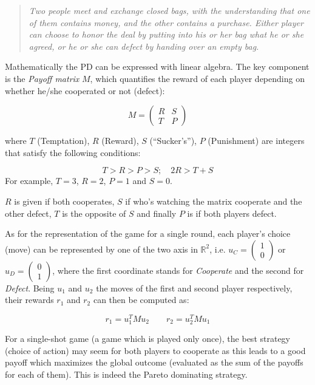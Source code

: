 \documentclass[journal,a4paper,10pt,twoside]{IEEEtran} %
\begin{document}
\begin{quote}
\textit{Two people meet and exchange closed bags, with the understanding that one of them contains money, and the other contains a purchase. Either player can choose to honor the deal by putting into his or her bag what he or she agreed, or he or she can defect by handing over an empty bag.}
\end{quote}

Mathematically the PD can be expressed with linear algebra. The key component is the \textit{Payoff matrix} $M$, which quantifies the reward of each player depending on whether he/she cooperated or not (defect):

$$
M = 
\begin{pmatrix} 
R & S \\
T & P 
\end{pmatrix}
$$

where $T$ (Temptation), $R$ (Reward), $S$ (``Sucker's''), $P$ (Punishment) are integers that satisfy the following conditions:

$$
T>R>P>S; \quad 2R > T+S 
$$
For example, $T=3$, $R=2$, $P=1$ and $S=0$.

$R$ is given if both cooperates, $S$ if who's watching the matrix cooperate and the other defect, $T$ is the opposite of $S$ and finally $P$ is if both players defect.

As for the representation of the game for a single round, each player's choice (move) can be represented by one of the two axis in $\mathbb{R}^2$, i.e. $u_C=\begin{pmatrix} 1 \\ 0 \end{pmatrix}$ or $u_D=\begin{pmatrix} 0 \\ 1 \end{pmatrix}$, where the first coordinate stands for \textit{Cooperate} and the second for \textit{Defect}. Being $u_1$ and $u_2$ the moves of the first and second player respectively, their rewards $r_1$ and $r_2$ can then be computed as:

$$
r_1 = u_1^T M u_2
\quad
\quad
r_2 = u_2^T M u_1
$$

For a single-shot game (a game which is played only once), the best strategy (choice of action) may seem for both players to cooperate as this leads to a good payoff which maximizes the global outcome (evaluated as the sum of the payoffs for each of them). This is indeed the Pareto dominating strategy. 
\end{document}
